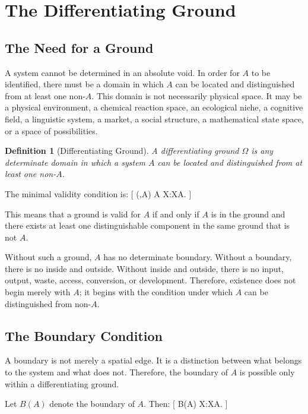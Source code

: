 \documentclass[11pt,a4paper]{article}
\newtheorem{definition}{Definition}
\newcommand{\Valid}{\operatorname{Valid}}
\begin{document}
\section{The Differentiating Ground}

\subsection{The Need for a Ground}

A system cannot be determined in an absolute void. In order for $A$ to be identified, there must be a domain in which $A$ can be located and distinguished from at least one non-$A$. This domain is not necessarily physical space. It may be a physical environment, a chemical reaction space, an ecological niche, a cognitive field, a linguistic system, a market, a social structure, a mathematical state space, or a space of possibilities.

\begin{definition}[Differentiating Ground]
A differentiating ground $\Omega$ is any determinate domain in which a system $A$ can be located and distinguished from at least one non-$A$.
\end{definition}

The minimal validity condition is:
[
\Valid(\Omega,A)
\Longleftrightarrow
A\in\Omega
\wedge
\exists X\in\Omega:X\neq A.
]

This means that a ground is valid for $A$ if and only if $A$ is in the ground and there exists at least one distinguishable component in the same ground that is not $A$.

Without such a ground, $A$ has no determinate boundary. Without a boundary, there is no inside and outside. Without inside and outside, there is no input, output, waste, access, conversion, or development. Therefore, existence does not begin merely with $A$; it begins with the condition under which $A$ can be distinguished from non-$A$.

\subsection{The Boundary Condition}

A boundary is not merely a spatial edge. It is a distinction between what belongs to the system and what does not. Therefore, the boundary of $A$ is possible only within a differentiating ground.

Let $B(A)$ denote the boundary of $A$. Then:
[
B(A)  \exists X\in\Omega:X\neq A.
]
\end{document}
